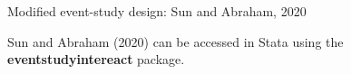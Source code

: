 \documentclass[notes,11pt, aspectratio=169]{beamer}
\newenvironment{wideitemize}{\itemize\addtolength{\itemsep}{10pt}}{\enditemize}
\begin{document}
\begin{frame}{Modified event-study design: Sun and Abraham, 2020}
\begin{wideitemize}
    \item Sun and Abraham (2020) can be accessed in Stata using the \textbf{eventstudyintereact} package. 
   
\end{wideitemize}
\end{frame}
\end{document}
